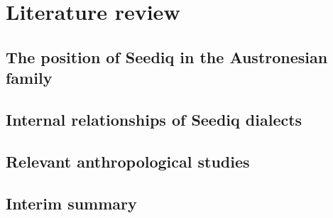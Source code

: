 \chapter{Literature review}\label{ch2}
\lipsum[1]

\section{The position of Seediq in the Austronesian family} \label{sec:position}
\lipsum[1-5]

\section{Internal relationships of Seediq dialects} \label{sec:subgroupinglit}
\lipsum[1-5]

\section{Relevant anthropological studies}
\lipsum[1-5]

\section{Interim summary}
\lipsum[1]
